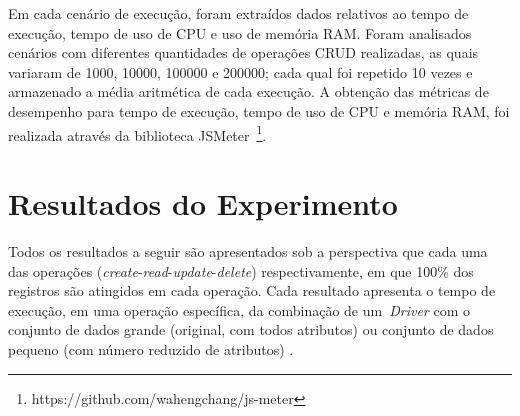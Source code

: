 \documentclass[12pt]{article}
\begin{document}
Em cada cenário de execução, foram extraídos dados relativos ao tempo de execução, tempo de uso de CPU e uso de memória RAM. Foram analisados cenários com diferentes quantidades de operações CRUD realizadas, as quais variaram de 1000, 10000, 100000 e 200000; cada qual foi repetido 10 vezes e armazenado a média aritmética de cada execução. A obtenção das métricas de desempenho para tempo de execução, tempo de uso de CPU e memória RAM, foi realizada através da biblioteca JSMeter~\footnote{https://github.com/wahengchang/js-meter}. 

\section{Resultados do Experimento}
\label{section:resultados}


Todos os resultados a seguir são apresentados sob a perspectiva que cada uma das operações (\emph{create}-\emph{read}-\emph{update}-\emph{delete}) respectivamente, em que 100\% dos registros são atingidos em cada operação. Cada resultado apresenta o tempo de execução, em uma operação específica, da combinação de um~\emph{Driver} com o  conjunto de dados grande (original, com todos atributos) ou conjunto de dados pequeno (com número reduzido de atributos) .
\end{document}
